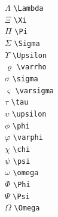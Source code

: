 \documentclass[xindy,rascunho]{fei}
\begin{document}
\begin{teorema}
\begin{multicols}{3}
\(\Lambda\) \verb+\Lambda+\\
\(\Xi\) \verb+\Xi+\\
\(\Pi\) \verb+\Pi+\\
\(\Sigma\) \verb+\Sigma+\\
\(\Upsilon\) \verb+\Upsilon+\\
\(\varrho\) \verb+\varrho+\\
\(\sigma\) \verb+\sigma+\\
\(\varsigma\) \verb+\varsigma+\\
\(\tau\) \verb+\tau+\\
\(\upsilon\) \verb+\upsilon+\\
\(\phi\) \verb+\phi+\\
\(\varphi\) \verb+\varphi+\\
\(\chi\) \verb+\chi+\\
\(\psi\) \verb+\psi+\\
\(\omega\) \verb+\omega+\\
\(\Phi\) \verb+\Phi+\\
\(\Psi\) \verb+\Psi+\\
\(\Omega\) \verb+\Omega+\\
\end{multicols}


\end{teorema}
\end{document}
